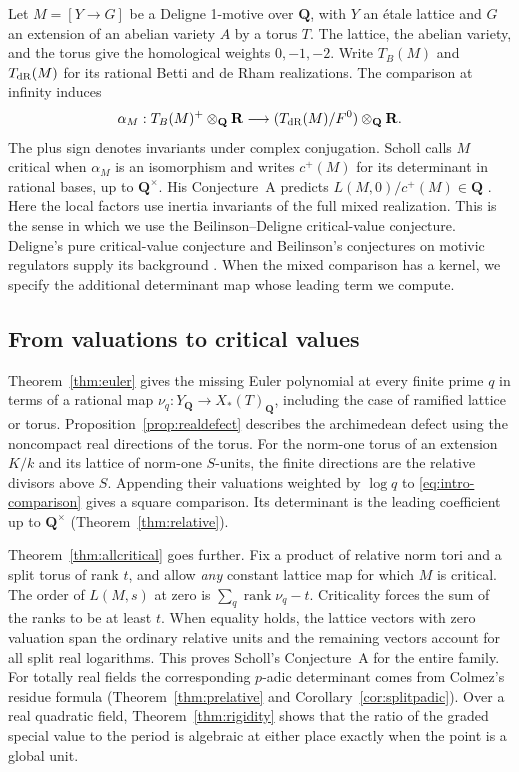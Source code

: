 \documentclass[11pt]{amsart}
\numberwithin{equation}{section}
\theoremstyle{definition}
\theoremstyle{remark}
\newcommand{\Q}{\mathbf Q}
\newcommand{\R}{\mathbf R}
\newcommand{\rank}{\operatorname{rank}}
\begin{document}
Let $M=[Y\to G]$ be a Deligne 1-motive over $\Q$, with $Y$ an
\'etale lattice and $G$ an extension of an abelian variety $A$ by
a torus $T$. The lattice, the abelian variety, and the torus give
the homological weights $0,-1,-2$. Write $T_B(M)$ and
$T_{\rm dR}(M)$ for its rational Betti and de Rham realizations.
The comparison at infinity induces
\begin{equation}\label{eq:intro-comparison}
 \alpha_M:T_B(M)^+\otimes_\Q\R\longrightarrow
                  (T_{\rm dR}(M)/F^0)\otimes_\Q\R .
\end{equation}
The plus sign denotes invariants under complex conjugation.
Scholl calls $M$ critical when $\alpha_M$ is an isomorphism and
writes $c^+(M)$ for its determinant in rational bases, up to
$\Q^\times$. His Conjecture~A predicts $L(M,0)/c^+(M)\in\Q$
\cite[\S II, Conj.~A]{Scholl}. Here the local factors use inertia
invariants of the full mixed realization. This is the sense in which
we use the Beilinson--Deligne critical-value conjecture. Deligne's
pure critical-value conjecture and Beilinson's conjectures on
motivic regulators supply its background
\cite{DeligneL,Beilinson,Nekovar}. When the mixed comparison has a
kernel, we specify the additional determinant map whose leading
term we compute.

\subsection*{From valuations to critical values}
Theorem~\ref{thm:euler} gives the missing Euler polynomial at every
finite prime $q$ in terms of a rational map
$\nu_q:Y_\Q\to X_*(T)_\Q$, including the case of ramified lattice
or torus. Proposition~\ref{prop:realdefect} describes the
archimedean defect using the noncompact real directions of the
torus. For the norm-one torus of an extension $K/k$ and its lattice
of norm-one $S$-units, the finite directions are the relative
divisors above $S$. Appending their valuations weighted by $\log q$
to \eqref{eq:intro-comparison} gives a square comparison. Its
determinant is the leading coefficient up to $\Q^\times$
(Theorem~\ref{thm:relative}).

Theorem~\ref{thm:allcritical} goes further. Fix a product of
relative norm tori and a split torus of rank $t$, and allow
\emph{any} constant lattice map for which $M$ is critical.
The order of $L(M,s)$ at zero is $\sum_q\rank\nu_q-t$.
Criticality forces the sum of the ranks to be at least $t$.
When equality holds, the lattice vectors with zero valuation span
the ordinary relative units and the remaining vectors account for
all split real logarithms. This proves Scholl's Conjecture~A for
the entire family. For totally real fields the corresponding
$p$-adic determinant comes from Colmez's residue formula
(Theorem~\ref{thm:prelative} and Corollary~\ref{cor:splitpadic}).
Over a real quadratic field, Theorem~\ref{thm:rigidity} shows
that the ratio of the graded special value to the period is algebraic
at either place exactly when the point is a global unit.
\end{document}
